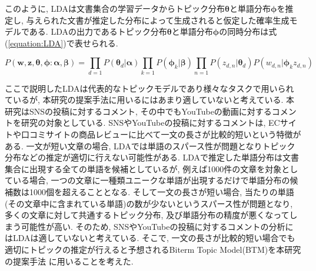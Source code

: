 \documentclass{ltjarticle}
\begin{document}
このように, LDAは文書集合の学習データからトピック分布$\boldsymbol{\theta}$と単語分布$\boldsymbol{\phi}$を推定し,  
与えられた文書が推定した分布によって生成されると仮定した確率生成モデルである. 
LDAの出力であるトピック分布$\boldsymbol{\theta}$と単語分布$\boldsymbol{\phi}$の同時分布は式(\ref{equation:LDA})で表せられる. 
\vspace{5truept}

\begin{equation}
    P(\boldsymbol{w}, \boldsymbol{z}, \boldsymbol{\theta}, \boldsymbol{\phi}:\boldsymbol{\alpha}, \boldsymbol{\beta}) = 
    \prod_{d=1}P(\boldsymbol{\theta}_d|\boldsymbol{\alpha}) \prod_{k=1}P(\boldsymbol{\phi}_k|\boldsymbol{\beta})
    \prod_{n=1}P(z_{d,n}|\boldsymbol{\theta}_d)P(w_{d,n}|\boldsymbol{\phi}_kz_{d,n})
    \label{equation:LDA}
\end{equation}
\vspace{10truept}

ここで説明したLDAは代表的なトピックモデルであり様々なタスクで用いられているが, 本研究の提案手法に用いるにはあまり適していないと考えている. 
本研究はSNSの投稿に対するコメント, その中でもYouTubeの動画に対するコメントを研究の対象としている. 
SNSやYouTubeの投稿に対するコメントは, ECサイトや口コミサイトの商品レビューに比べて一文の長さが比較的短いという特徴がある. 
一文が短い文章の場合, LDAでは単語のスパース性が問題となりトピック分布などの推定が適切に行えない可能性がある. 
LDAで推定した単語分布は文書集合に出現する全ての単語を候補としているが, 例えば1000件の文章を対象としている場合, 
一つの文章に一種類ユニークな単語が出現するだけで単語分布の候補数は1000個を超えることとなる.
そして一文の長さが短い場合, 当たりの単語(その文章中に含まれている単語)の数が少ないというスパース性が問題となり, 
多くの文章に対して共通するトピック分布, 及び単語分布の精度が悪くなってしまう可能性が高い. 
そのため, SNSやYouTubeの投稿に対するコメントの分析にはLDAは適していないと考えている. 
そこで, 一文の長さが比較的短い場合でも適切にトピックの推定が行えると予想されるBiterm Topic Model(BTM)を本研究の提案手法
に用いることを考えた. 
\vspace{10truept}
\end{document}
